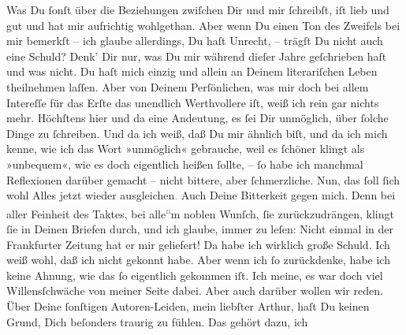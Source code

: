 \pstart
           Was Du ſonſt über die Beziehungen zwiſchen Dir und mir ſchreibſt, iſt lieb und gut
               und hat mir aufrichtig wohlgethan. Aber wenn Du einen Ton des Zweifels bei {\pb}mir bemerkſt – ich glaube allerdings, Du haſt
               Unrecht, – trägſt Du nicht auch eine Schuld? Denk’ Dir nur, was Du mir während dieſer
               Jahre geſchrieben haſt und was nicht. Du haſt mich einzig und allein an Deinem
               literariſchen Leben theilnehmen laſſen. Aber von Deinem Perſönlichen, was mir doch
               bei allem Intereſſe für das Erſte das unendlich Werthvollere iſt, weiß ich rein gar
               nichts mehr. Höchſtens hier und da eine Andeutung, es ſei Dir unmöglich, über ſolche
               Dinge zu ſchreiben. Und da ich weiß, daß Du mir ähnlich biſt, und da ich mich kenne,
               wie ich das Wort »unmöglich« gebrauche, weil es ſchöner klingt als »unbequem«, {\pb}wie es doch eigentlich heißen ſollte, – ſo habe ich
               manchmal Reflexionen darüber gemacht – nicht bittere, aber ſchmerzliche. Nun, das
               ſoll ſich wohl Alles jetzt wieder ausgleichen\textcolor{gray}{.} Auch Deine
               Bitterkeit gegen mich. Denn bei aller Feinheit des Taktes, bei alle\substVorne{}\textsuperscript{\textcolor{gray}{n}}\substDazwischen{}m\substHinten{} noblen Wunſch, ſie zurückzudrängen, klingt ſie in Deinen Briefen durch, und
               ich glaube, immer zu leſen: Nicht einmal \label{K_L02712-3v}\label{K_L02712-3} in der Frankfurter Zeitung hat er mir
               geliefert! Da habe ich wirklich große Schuld. Ich weiß wohl, daß ich nicht gekonnt
               habe. Aber wenn ich ſo zurückdenke, habe ich keine Ahnung, wie das ſo eigentlich {\pb}gekommen iſt. Ich meine, es war doch viel
               Willensſchwäche von meiner Seite dabei. Aber auch darüber wollen wir reden. Über
               Deine ſonſtigen Autoren-Leiden, mein liebſter Arthur,  haſt Du keinen Grund, Dich beſonders traurig zu fühlen. Das gehört dazu, ich
